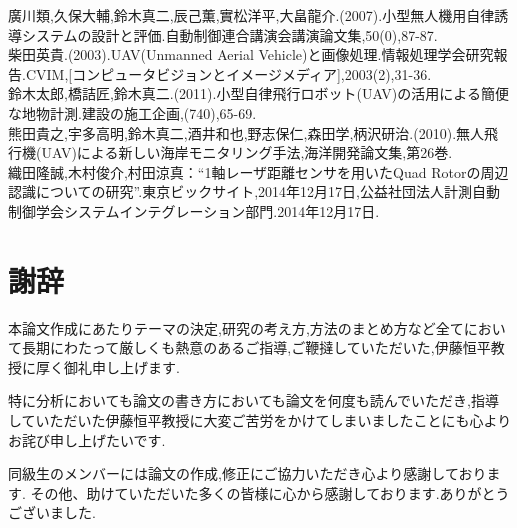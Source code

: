\documentclass[12pt,oneside]{sotsuken_paper}
\begin{document}
\begin{thebibliography}{8}
廣川類,久保大輔,鈴木真二,辰己薫,實松洋平,大畠龍介.(2007).小型無人機用自律誘導システムの設計と評価.自動制御連合講演会講演論文集,50(0),87-87.\\
柴田英貴.(2003).UAV(Unmanned Aerial Vehicle)と画像処理.情報処理学会研究報告.CVIM,[コンピュータビジョンとイメージメディア],2003(2),31-36.\\
鈴木太郎,橋詰匠,鈴木真二.(2011).小型自律飛行ロボット(UAV)の活用による簡便な地物計測.建設の施工企画,(740),65-69.\\
熊田貴之,宇多高明,鈴木真二,酒井和也,野志保仁,森田学,柄沢研治.(2010).無人飛行機(UAV)による新しい海岸モニタリング手法,海洋開発論文集,第26巻.\\
織田隆誠,木村俊介,村田涼真：“1軸レーザ距離センサを用いたQuad Rotorの周辺認識についての研究”.東京ビックサイト,2014年12月17日,公益社団法人計測自動制御学会システムインテグレーション部門.2014年12月17日.
\end{thebibliography}

\chapter*{謝辞}
本論文作成にあたりテーマの決定,研究の考え方,方法のまとめ方など全てにおいて長期にわたって厳しくも熱意のあるご指導,ご鞭撻していただいた,伊藤恒平教授に厚く御礼申し上げます.


特に分析においても論文の書き方においても論文を何度も読んでいただき,指導していただいた伊藤恒平教授に大変ご苦労をかけてしまいましたことにも心よりお詫び申し上げたいです.


同級生のメンバーには論文の作成,修正にご協力いただき心より感謝しております.
その他、助けていただいた多くの皆様に心から感謝しております.ありがとうございました.
\end{document}
